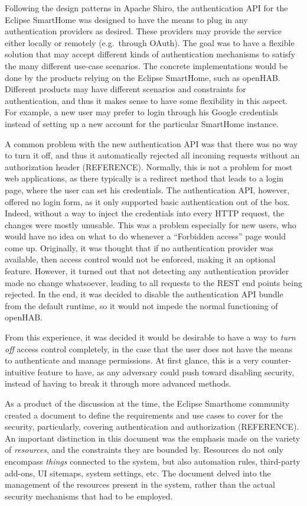 \documentclass[12pt]{article}
\begin{document}
Following the design patterns in Apache Shiro, the authentication API for the Eclipse SmartHome was designed to have the means to plug in any authentication providers as desired. These providers may provide the service either locally or remotely (e.g.\ through OAuth). The goal was to have a flexible solution that may accept different kinds of authentication mechanisms to satisfy the many different use-case scenarios. The concrete implementations would be done by the products relying on the Eclipse SmartHome, such as openHAB. Different products may have different scenarios and constraints for authentication, and thus it makes sense to have some flexibility in this aspect. For example, a new user may prefer to login through his Google credentials instead of setting up a new account for the particular SmartHome instance. 

A common problem with the new authentication API was that there was no way to turn it off, and thus it automatically rejected all incoming requests without an authorization header (REFERENCE). Normally, this is not a problem for most web applications, as there typically is a redirect method that leads to a login page, where the user can set his credentials. The authentication API, however, offered no login form, as it only supported basic authentication out of the box. Indeed, without a way to inject the credentials into every HTTP request, the changes were mostly unusable. This was a problem especially for new users, who would have no idea on what to do whenever a ``Forbidden access'' page would come up. Originally, it was thought that if no authentication provider was available, then access control would not be enforced, making it an optional feature. However, it turned out that not detecting any authentication provider made no change whatsoever, leading to all requests to the REST end points being rejected. In the end, it was decided to disable the authentication API bundle from the default runtime, so it would not impede the normal functioning of openHAB.

From this experience, it was decided it would be desirable to have a way to \emph{turn off} access control completely, in the case that the user does not have the means to authenticate and manage permissions. At first glance, this is a very counter-intuitive feature to have, as any adversary could push toward disabling security, instead of having to break it through more advanced methods. 

As a product of the discussion at the time, the Eclipse Smarthome community created a document to define the requirements and use cases to cover for the security, particularly, covering authentication and authorization (REFERENCE). An important distinction in this document was the emphasis made on the variety of \emph{resources}, and the constraints they are bounded by. Resources do not only encompass \emph{things} connected to the system, but also automation rules, third-party add-ons, UI sitemaps, system settings, etc. The document delved into the management of the resources present in the system, rather than the actual security mechanisms that had to be employed. 
\end{document}
